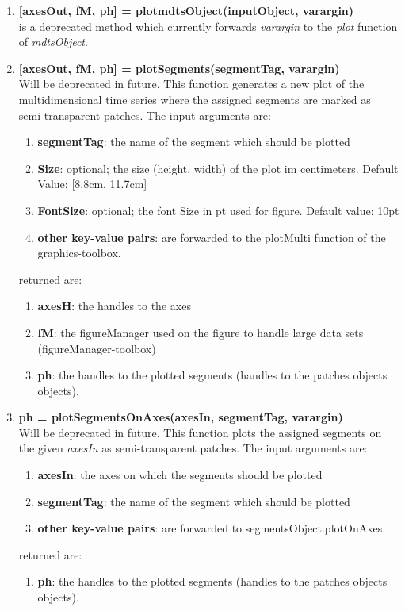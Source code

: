 \documentclass[a4]{scrreprt}
\begin{document}
\begin{enumerate}
\item \textbf{[axesOut, fM, ph] = plotmdtsObject(inputObject, varargin)}\\
is a deprecated method which currently forwards \textit{varargin} to the \textit{plot} function of \textit{mdtsObject}.

\item \textbf{[axesOut, fM, ph] = plotSegments(segmentTag, varargin)}\\
Will be deprecated in future. This function generates a new plot of the multidimensional time series where the assigned segments are marked as semi-transparent patches.
The input arguments are:
	\begin{enumerate}
		\item \textbf{segmentTag}: the name of the segment which should be plotted
		\item \textbf{Size}: optional; the size (height, width) of the plot im centimeters. Default Value: [8.8cm, 11.7cm] 
		\item \textbf{FontSize}: optional; the font Size in pt used for figure. Default value: 10pt
		\item \textbf{other key-value pairs}: are forwarded to the plotMulti function of the graphics-toolbox.
	\end{enumerate}
returned are:
	\begin{enumerate}
		\item \textbf{axesH}: the handles to the axes
		\item \textbf{fM}: the figureManager used on the figure to handle large data sets (figureManager-toolbox)
		\item \textbf{ph}: the handles to the plotted segments (handles to the patches objects objects).
	\end{enumerate}

\item \textbf{ph = plotSegmentsOnAxes(axesIn, segmentTag, varargin)}\\
Will be deprecated in future. This function plots the assigned segments on the given \textit{axesIn} as semi-transparent patches.
The input arguments are:
	\begin{enumerate}
		\item \textbf{axesIn}: the axes on which the segments should be plotted
		\item \textbf{segmentTag}: the name of the segment which should be plotted
		\item \textbf{other key-value pairs}: are forwarded to segmentsObject.plotOnAxes.
	\end{enumerate}
returned are:
	\begin{enumerate}
		\item \textbf{ph}: the handles to the plotted segments (handles to the patches objects objects).
	\end{enumerate}

\end{enumerate}
\end{document}
